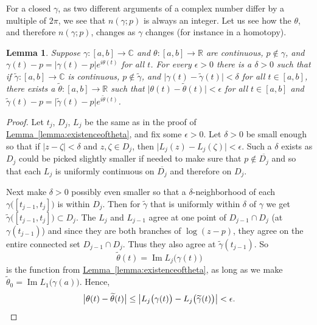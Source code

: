 \documentclass[12pt,openany]{book}
\renewcommand{\Im}{\operatorname{Im}}
\newcommand{\sabs}[1]{\lvert {#1} \rvert}
\newcommand{\babs}[1]{\bigl\lvert {#1} \bigr\rvert}
\newcommand{\C}{{\mathbb{C}}}
\newcommand{\R}{{\mathbb{R}}}
\theoremstyle{plain}
\newtheorem{lemma}[thm]{Lemma}
\theoremstyle{remark}
\theoremstyle{definition}
\theoremstyle{exercise}
\theoremstyle{example}
\newcommand{\lemmaref}[1]{\hyperref[#1]{Lemma~\ref*{#1}}}
\begin{document}
For a closed $\gamma$, as two different arguments of a complex number differ by
a multiple of $2 \pi$, we see that $n(\gamma;p)$ is always an integer.
Let us see how the $\theta$, and therefore $n(\gamma;p)$, changes 
as $\gamma$ changes (for instance in a homotopy).

\begin{lemma} \label{lemma:changeintheta}
Suppose $\gamma \colon [a,b] \to \C$ and $\theta \colon [a,b] \to \R$
are continuous, $p \notin \gamma$,
and $\gamma(t)-p = \sabs{\gamma(t)-p} e^{i\theta(t)}$ for all $t$.
For every $\epsilon > 0$ there is a $\delta > 0$ such that
if $\widetilde{\gamma} \colon [a,b] \to \C$ is continuous,
$p \notin \widetilde{\gamma}$, and
$\sabs{\gamma(t)-\widetilde{\gamma}(t)} < \delta$ for all $t \in [a,b]$,
there exists a $\widetilde{\theta} \colon [a,b] \to \R$ such that
$\sabs{\theta(t)-\widetilde{\theta}(t)} < \epsilon$ for all $t \in [a,b]$
and $\widetilde{\gamma}(t)-p = \sabs{\widetilde{\gamma}(t)-p}
e^{i\widetilde{\theta}(t)}$.
\end{lemma}

\begin{proof}
Let $t_j$, $D_j$, $L_j$ be the same as in the proof of
\lemmaref{lemma:existenceoftheta}, and fix some $\epsilon > 0$.
Let $\delta > 0$ be small enough so that if $\sabs{z-\zeta}
< \delta$ and $z,\zeta \in D_j$, then $\sabs{L_j(z)-L_j(\zeta)} < \epsilon$.
Such a $\delta$ exists as $D_j$ could be picked slightly smaller if needed
to make sure that $p \not\in \overline{D_j}$ and so that each $L_j$
is uniformly continuous on $\overline{D_j}$ and therefore on $D_j$.

Next make $\delta > 0$ possibly even smaller so that a $\delta$-neighborhood of each
$\gamma\bigl([t_{j-1},t_j]\bigr)$ is within $D_j$.  Then
for $\widetilde{\gamma}$ that is uniformly within $\delta$ of $\gamma$ we
get
$\widetilde{\gamma}\bigl([t_{j-1},t_j]\bigr) \subset D_j$.
The $L_j$ and $L_{j-1}$ agree at one point of $D_{j-1} \cap D_j$ (at
$\gamma(t_{j-1})$) and since they are both branches of $\log (z-p)$, they
agree on the entire connected set $D_{j-1} \cap D_j$.  Thus they also
agree at $\widetilde{\gamma}(t_{j-1})$.
So
\begin{equation*}
\widetilde{\theta}(t)
=
\Im L_j\bigl(\gamma(t)\bigr)
\end{equation*}
is the function from \lemmaref{lemma:existenceoftheta}, as long as we make
$\widetilde{\theta}_0 = \Im L_1\bigl(\gamma(a)\bigr)$.
Hence,
\begin{equation*}
\babs{\theta(t) - \widetilde{\theta}(t)}
\leq
\babs{
L_j\bigl(\gamma(t)\bigr)
-
L_j\bigl(\widetilde{\gamma}(t)\bigr)
}
< \epsilon. \qedhere
\end{equation*}
\end{proof}
\end{document}
